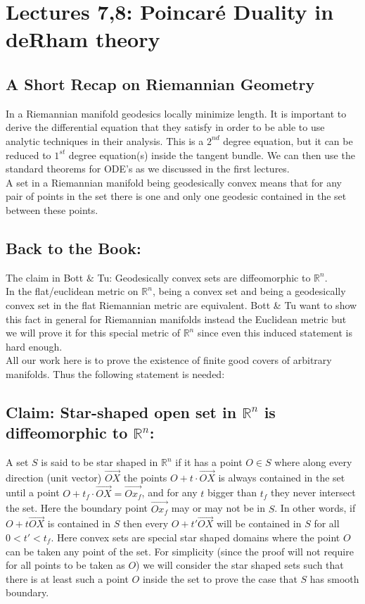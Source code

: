 \documentclass[12pt]{amsart}
\theoremstyle{remark}
\begin{document}
 \section{Lectures 7,8: Poincaré Duality in deRham theory}
 

\subsection{A Short Recap on Riemannian Geometry}

\indent \indent In a Riemannian manifold geodesics locally minimize length. It is important to derive the differential equation that they satisfy in order to be able to use analytic techniques in their analysis. This is a $2^{nd}$ degree equation, but it can be reduced to $1^{st}$ degree equation(s) inside the tangent bundle. We can then use the standard theorems for ODE's as we discussed in the first lectures. \\
\indent \indent A set in a Riemannian manifold being geodesically convex means that for any pair of points in the set there is one and only one geodesic contained in the set between these points. 
\subsection{Back to the Book:} \indent The claim in Bott $\&$ Tu: Geodesically convex sets are diffeomorphic to $\mathbb{R}^n$. \\
\indent In the flat/euclidean metric on $\mathbb{R}^n$, being a convex set and being a geodesically convex set in the flat Riemannian metric are equivalent. Bott \& Tu want to show this fact in general for Riemannian manifolds instead the Euclidean metric but we will prove it for this special metric of $\mathbb{R}^n$ since even this induced statement is hard enough. \\
\indent \indent All our work here is to prove the existence of finite good covers of arbitrary manifolds. Thus the following statement is needed:
\subsection{\textbf{Claim: Star-shaped open set in $\mathbb{R}^n$ is diffeomorphic to $\mathbb{R}^n$:}} 
\indent \indent A set $S$ is said to be star shaped in $\mathbb{R}^n$ if it has a point $O\in S$ where along every direction (unit vector) $\overrightarrow{OX}$ the points $O + t \cdot\overrightarrow{OX}$ is always contained in the set until a point $O + t_f\cdot \overrightarrow{OX} = \overrightarrow{Ox_f}$, and for any $t$ bigger than $t_f$ they never intersect the set. Here the boundary point $\overrightarrow{Ox_f}$ may or may not be in $S$. In other words, if $O + t \overrightarrow{OX}$ is contained in $S$ then every $O + t' \overrightarrow{OX}$ will be contained in $S$ for all $0 < t' < t_f$. Here convex sets are special star shaped domains where the point $O$ can be taken any point of the set. For simplicity (since the proof will not require for all points to be taken as $O$) we will consider the star shaped sets such that there is at least such a point $O$ inside the set to prove the case that $S$ has smooth boundary.
\end{document}
